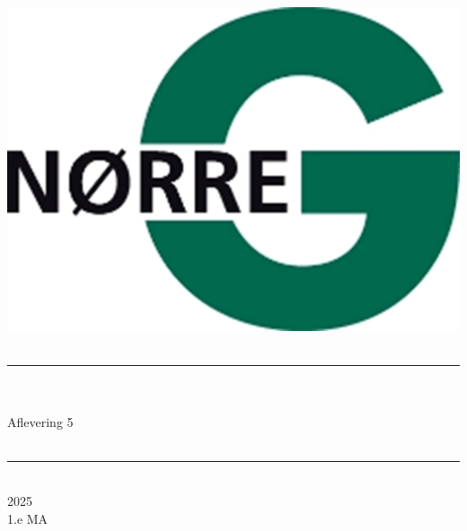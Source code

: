 \documentclass[12pt,x11names,a4paper]{article}
\begin{document}
%

\begin{titlepage}

\begin{minipage}{0.27\textwidth}

\end{minipage}
\begin{minipage}{0.73\textwidth}
\begin{center}
\phantom{h} \vspace{1cm}\\
\hspace{4cm}
\includegraphics[scale = 1]{Billeder/Norreg.png} \\
\phantom{h} \vspace{5cm}\\
\rule{0.7\textwidth}{0.3mm}\\
\phantom{h}\\
{\fontsize{50}{60}\selectfont Aflevering 5}\\
\phantom{h}\\
\rule{0.7\textwidth}{0.3mm}\\
\Large 2025\\
\Large 1.e MA

\end{center}
\end{minipage}
\end{titlepage}
\end{document}
